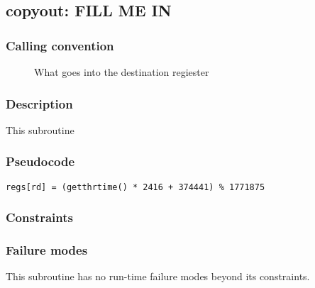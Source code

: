 \clearpage
{}
{}
\label{subr:copyout}
\subsection*{copyout: FILL ME IN}

\subsubsection*{Calling convention}

\begin{description}
\item[] What goes into the destination regiester
\end{description}

\subsubsection*{Description}

This subroutine 
\subsubsection*{Pseudocode}

\begin{verbatim}
regs[rd] = (getthrtime() * 2416 + 374441) % 1771875
\end{verbatim}

\subsubsection*{Constraints}

\subsubsection*{Failure modes}

This subroutine has no run-time failure modes beyond its constraints.
